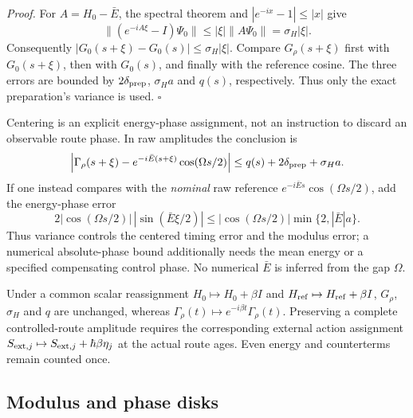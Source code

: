\emph{Proof.} For $A=H_0-\bar E$, the spectral theorem and
$|e^{-ix}-1|\leq|x|$ give
\begin{equation}
 \|(e^{-iA\xi}-I)\Psi_0\|
 \leq |\xi|\|A\Psi_0\|=\sigma_H|\xi|.
\end{equation}
Consequently $|G_0(s+\xi)-G_0(s)|\leq\sigma_H|\xi|$.
Compare $G_\rho(s+\xi)$ first with $G_0(s+\xi)$, then with $G_0(s)$,
and finally with the reference cosine. The three errors are bounded by
$2\delta_{\rm prep}$, $\sigma_Ha$ and $q(s)$, respectively. Thus only
the exact preparation's variance is used. $\square$

Centering is an explicit energy-phase assignment, not an instruction to
discard an observable route phase. In raw amplitudes the conclusion is
\begin{equation}
 \left|\Gamma_\rho(s+\xi)
 -e^{-i\bar E(s+\xi)}\cos(\Omega s/2)\right|
 \leq q(s)+2\delta_{\rm prep}+\sigma_Ha.
\label{eq:chvi-foundation-raw-jitter}
\end{equation}
If one instead compares with the \emph{nominal} raw reference
$e^{-i\bar Es}\cos(\Omega s/2)$, add the energy-phase error
\begin{equation}
 2|\cos(\Omega s/2)|\,|\sin(\bar E\xi/2)|
 \leq |\cos(\Omega s/2)|\min\{2,|\bar E|a\}.
\label{eq:chvi-foundation-mean-phase-jitter}
\end{equation}
Thus variance controls the centered timing error and the modulus error;
a numerical absolute-phase bound additionally needs the mean energy or
a specified compensating control phase. No numerical $\bar E$ is inferred
from the gap $\Omega$.

Under a common scalar reassignment $H_0\mapsto H_0+\beta I$ and
$H_{\rm ref}\mapsto H_{\rm ref}+\beta I$, $G_\rho$, $\sigma_H$ and
$q$ are unchanged, whereas $\Gamma_\rho(t)\mapsto
e^{-i\beta t}\Gamma_\rho(t)$. Preserving a complete controlled-route
amplitude requires the corresponding external action assignment
$S_{{\rm ext},j}\mapsto S_{{\rm ext},j}+\hbar\beta\eta_j$ at the
actual route ages. Even energy and counterterms remain counted once.

\subsection{Modulus and phase disks}

